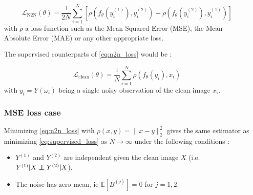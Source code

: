 \begin{equation}
    \mathcal{L}_{\text{N2N}}(\theta) = \frac{1}{2N} \sum_{i=1}^N \left[ \rho(f_\theta(y_i^{(1)}), y_i^{(2)}) + \rho(f_\theta(y_i^{(2)}), y_i^{(1)}) \right]
    \label{eq:n2n_loss}
\end{equation}
with $\rho$ a loss function such as the Mean Squared Error (MSE), the Mean Absolute Error (MAE) or any other appropriate loss.

The supervised counterparts of \ref{eq:n2n_loss} would be :

\begin{equation}
    \mathcal{L}_{\text{clean}}(\theta) = \frac{1}{N} \sum_{i=1}^N \rho(f_\theta(y_i), x_i) 
    \label{eq:supervised_loss}
\end{equation}
with $y_i = Y(\omega_i)$ being a single noisy observation of the clean image $x_i$.

\subsubsection{MSE loss case}

\begin{theorem}
    \label{th:noise2noise_l2}
    Minimizing \ref{eq:n2n_loss} with $\rho(x, y) = \| x - y \|_2^2$ gives the same estimator as minimizing \ref{eq:supervised_loss} as $N \to \infty$ under the following conditions :
    \begin{itemize}
        \item $Y^{(1)}$ and $Y^{(2)}$ are independent given the clean image $X$ (i.e. $Y^{(1)} | X \independent Y^{(2)} | X$).
        \item The noise has zero mean, ie $\mathbb{E}[B^{(j)}] = 0$ for $j = 1, 2$.
    \end{itemize}
\end{theorem}

